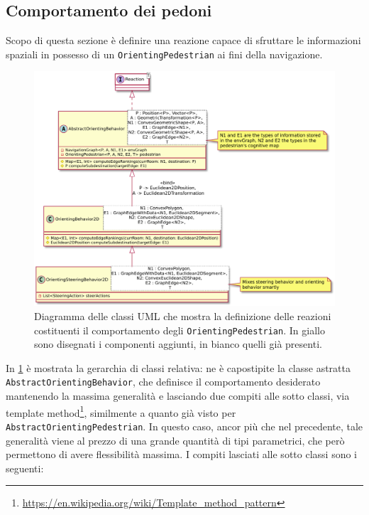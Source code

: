 \documentclass[12pt,a4paper,openright,oneside]{book}
\begin{document}
\subsection{Comportamento dei pedoni}
\label{design-orienting-behavior}
Scopo di questa sezione è definire una reazione capace di sfruttare le informazioni spaziali in possesso di un \texttt{OrientingPedestrian} ai fini della navigazione. 
\begin{figure}
	\centering
	\includegraphics[width=0.8\linewidth]{figures/orienting-behavior.pdf}
	\caption{Diagramma delle classi UML che mostra la definizione delle reazioni costituenti il comportamento degli \texttt{OrientingPedestrian}. In giallo sono disegnati i componenti aggiunti, in bianco quelli già presenti.}
	\label{fig:orienting-behavior}
\end{figure}
In \cref{fig:orienting-behavior} è mostrata la gerarchia di classi relativa: ne è capostipite la classe astratta \texttt{AbstractOrientingBehavior}, che definisce il comportamento desiderato mantenendo la massima generalità e lasciando due compiti alle sotto classi, via template method\footnote{\url{https://en.wikipedia.org/wiki/Template_method_pattern}}, similmente a quanto già visto per \texttt{AbstractOrientingPedestrian}. In questo caso, ancor più che nel precedente, tale generalità viene al prezzo di una grande quantità di tipi parametrici, che però permettono di avere flessibilità massima. I compiti lasciati alle sotto classi sono i seguenti:
\end{document}
